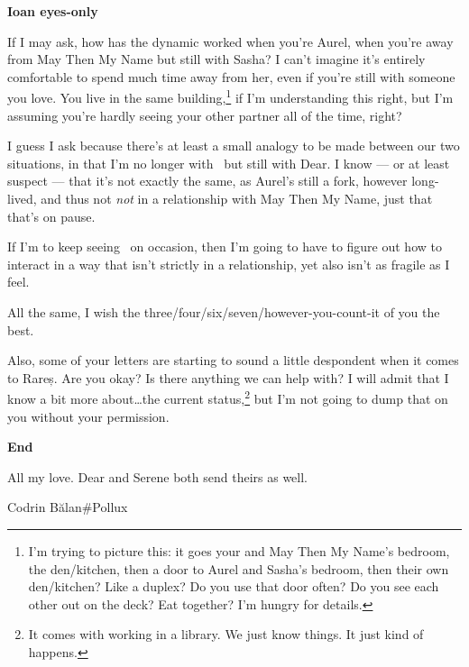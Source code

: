 \textbf{Ioan eyes-only}

If I may ask, how has the dynamic worked when you're Aurel, when you're away from May Then My Name but still with Sasha? I can't imagine it's entirely comfortable to spend much time away from her, even if you're still with someone you love. You live in the same building,\footnote{I'm trying to picture this: it goes your and May Then My Name's bedroom, the den/kitchen, then a door to Aurel and Sasha's bedroom, then their own den/kitchen? Like a duplex? Do you use that door often? Do you see each other out on the deck? Eat together? I'm hungry for details.} if I'm understanding this right, but I'm assuming you're hardly seeing your other partner all of the time, right?

I guess I ask because there's at least a small analogy to be made between our two situations, in that I'm no longer with \Partner\ but still with Dear. I know — or at least suspect — that it's not exactly the same, as Aurel's still a fork, however long-lived, and thus not \emph{not} in a relationship with May Then My Name, just that that's on pause.

If I'm to keep seeing \Partner\ on occasion, then I'm going to have to figure out how to interact in a way that isn't strictly in a relationship, yet also isn't as fragile as I feel.

All the same, I wish the three/four/six/seven/however-you-count-it of you the best.

Also, some of your letters are starting to sound a little despondent when it comes to Rareș. Are you okay? Is there anything we can help with? I will admit that I know a bit more about\ldots{}the current status,\footnote{It comes with working in a library. We just know things. It just kind of happens.} but I'm not going to dump that on you without your permission.

\textbf{End}

All my love. Dear and Serene both send theirs as well.

Codrin Bălan\#Pollux
